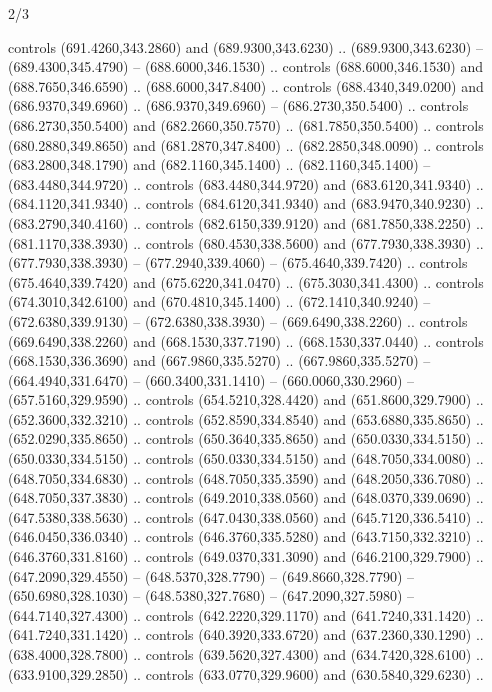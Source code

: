 \begin{flagdescription}{2/3}
\begin{scope}[xshift=0.5\flaglength,yshift=0.5\flagwidth,scale=\flagwidth/638.38]
\begin{scope}[y=0.80pt, x=0.80pt, yscale=-1,shift={(-600,-400)}]
\begin{scope}[shift={(-0.02,2.173)}]
  controls (691.4260,343.2860) and (689.9300,343.6230) .. (689.9300,343.6230) --
  (689.4300,345.4790) -- (688.6000,346.1530) .. controls (688.6000,346.1530) and
  (688.7650,346.6590) .. (688.6000,347.8400) .. controls (688.4340,349.0200) and
  (686.9370,349.6960) .. (686.9370,349.6960) -- (686.2730,350.5400) .. controls
  (686.2730,350.5400) and (682.2660,350.7570) .. (681.7850,350.5400) .. controls
  (680.2880,349.8650) and (681.2870,347.8400) .. (682.2850,348.0090) .. controls
  (683.2800,348.1790) and (682.1160,345.1400) .. (682.1160,345.1400) --
  (683.4480,344.9720) .. controls (683.4480,344.9720) and (683.6120,341.9340) ..
  (684.1120,341.9340) .. controls (684.6120,341.9340) and (683.9470,340.9230) ..
  (683.2790,340.4160) .. controls (682.6150,339.9120) and (681.7850,338.2250) ..
  (681.1170,338.3930) .. controls (680.4530,338.5600) and (677.7930,338.3930) ..
  (677.7930,338.3930) -- (677.2940,339.4060) -- (675.4640,339.7420) .. controls
  (675.4640,339.7420) and (675.6220,341.0470) .. (675.3030,341.4300) .. controls
  (674.3010,342.6100) and (670.4810,345.1400) .. (672.1410,340.9240) --
  (672.6380,339.9130) -- (672.6380,338.3930) -- (669.6490,338.2260) .. controls
  (669.6490,338.2260) and (668.1530,337.7190) .. (668.1530,337.0440) .. controls
  (668.1530,336.3690) and (667.9860,335.5270) .. (667.9860,335.5270) --
  (664.4940,331.6470) -- (660.3400,331.1410) -- (660.0060,330.2960) --
  (657.5160,329.9590) .. controls (654.5210,328.4420) and (651.8600,329.7900) ..
  (652.3600,332.3210) .. controls (652.8590,334.8540) and (653.6880,335.8650) ..
  (652.0290,335.8650) .. controls (650.3640,335.8650) and (650.0330,334.5150) ..
  (650.0330,334.5150) .. controls (650.0330,334.5150) and (648.7050,334.0080) ..
  (648.7050,334.6830) .. controls (648.7050,335.3590) and (648.2050,336.7080) ..
  (648.7050,337.3830) .. controls (649.2010,338.0560) and (648.0370,339.0690) ..
  (647.5380,338.5630) .. controls (647.0430,338.0560) and (645.7120,336.5410) ..
  (646.0450,336.0340) .. controls (646.3760,335.5280) and (643.7150,332.3210) ..
  (646.3760,331.8160) .. controls (649.0370,331.3090) and (646.2100,329.7900) ..
  (647.2090,329.4550) -- (648.5370,328.7790) -- (649.8660,328.7790) --
  (650.6980,328.1030) -- (648.5380,327.7680) -- (647.2090,327.5980) --
  (644.7140,327.4300) .. controls (642.2220,329.1170) and (641.7240,331.1420) ..
  (641.7240,331.1420) .. controls (640.3920,333.6720) and (637.2360,330.1290) ..
  (638.4000,328.7800) .. controls (639.5620,327.4300) and (634.7420,328.6100) ..
  (633.9100,329.2850) .. controls (633.0770,329.9600) and (630.5840,329.6230) ..

\end{scope}
\end{scope}
\end{scope}
\end{flagdescription}
